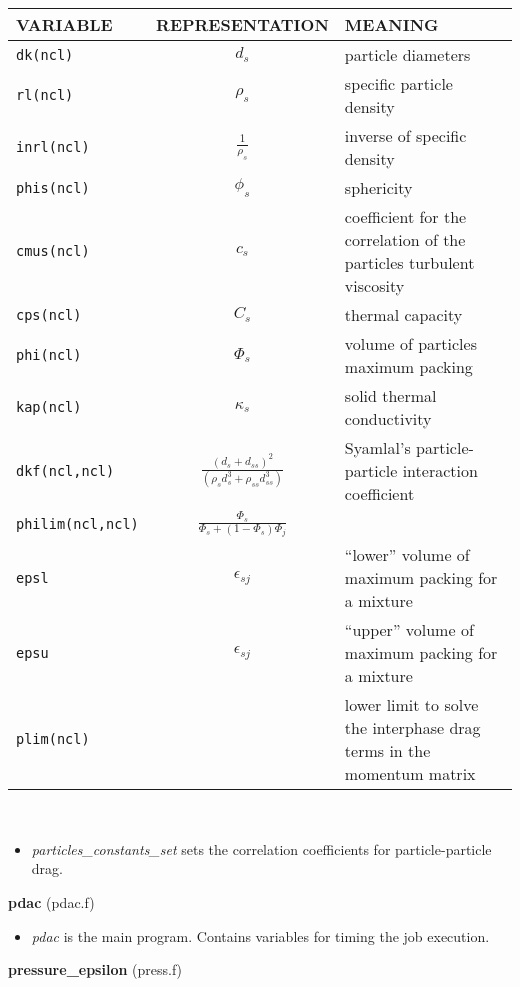 \begin{tabular}{|p{6cm}|c|p{6cm}|}\hline
VARIABLE & REPRESENTATION & MEANING\\\hline
\tt dk(ncl) & $d_s$ &  particle diameters\\\hline
\tt rl(ncl) & $\rho_s$ & specific particle density\\\hline
\tt inrl(ncl)& $\frac{1}{\rho_s} $& inverse of specific density\\\hline
\tt phis(ncl)& $\phi_s$   & sphericity\\\hline
\tt cmus(ncl) & $c_s$ & coefficient for the correlation of the particles turbulent viscosity\\\hline
\tt cps(ncl) & $C_s$ &   thermal capacity\\\hline
\tt phi(ncl) & $\Phi_s$ & volume of particles maximum packing\\\hline
\tt kap(ncl) & $\kappa_s$ &  solid thermal conductivity\\\hline
\tt dkf(ncl,ncl) & $\frac{(d_s+d_{ss})^2}{(\rho_sd_s^3+\rho_{ss}d_{ss}^3)}$ &   Syamlal's particle-particle interaction coefficient \\\hline
\tt philim(ncl,ncl) &$ \frac{\Phi_s}{\Phi_s+(1-\Phi_s)\Phi_j}$& \\\hline
\tt epsl & $\epsilon_{sj}$ & ``lower'' volume of maximum packing for a mixture\\\hline
\tt epsu & $\epsilon_{sj}$ & ``upper'' volume of maximum packing for a mixture\\\hline
\tt plim(ncl) &  &  lower limit to solve the interphase drag terms in the momentum matrix \\\hline
\end{tabular}\\
\begin{itemize}
\item{\em particles\_constants\_set} sets the correlation coefficients for particle-particle drag.
\end{itemize}
%
%
{\large{\bf pdac}} (pdac.f)\\[5mm]
\begin{itemize}
\item {\em pdac} is the main program. Contains variables for timing the job execution.
\end{itemize}
%
%
{\large{\bf pressure\_epsilon}} (press.f)\\[5mm]
